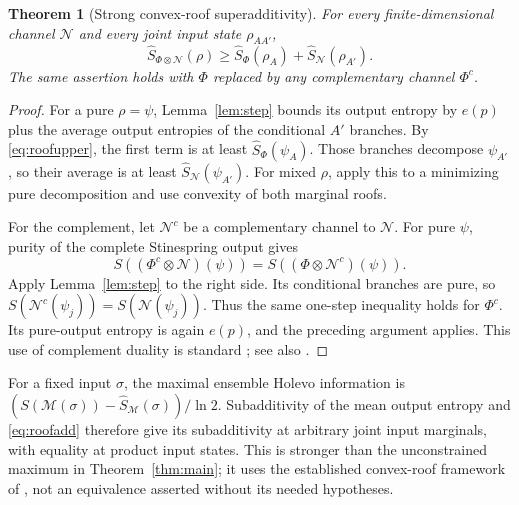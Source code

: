 \documentclass[11pt]{article}
\newtheorem{theorem}{Theorem}
\begin{document}
\begin{theorem}[Strong convex-roof superadditivity]\label{thm:roofadd}
For every finite-dimensional channel $\mathcal N$ and every joint input state
$\rho_{AA'}$,
\begin{equation}\label{eq:roofadd}
 \widehat S_{\Phi\otimes\mathcal N}(\rho)
 \ge \widehat S_\Phi(\rho_A)+\widehat S_{\mathcal N}(\rho_{A'}).
\end{equation}
The same assertion holds with $\Phi$ replaced by any complementary channel
$\Phi^c$.
\end{theorem}
\begin{proof}
For a pure $\rho=\psi$, Lemma~\ref{lem:step} bounds its output entropy by
$e(p)$ plus the average output entropies of the conditional $A'$ branches.
By \eqref{eq:roofupper}, the first term is at least
$\widehat S_\Phi(\psi_A)$. Those branches decompose $\psi_{A'}$, so their
average is at least $\widehat S_{\mathcal N}(\psi_{A'})$.
For mixed $\rho$, apply this to a minimizing pure decomposition and use
convexity of both marginal roofs.

For the complement, let $\mathcal N^c$ be a complementary channel to
$\mathcal N$. For pure $\psi$, purity of the complete Stinespring output gives
\[
 S((\Phi^c\otimes\mathcal N)(\psi))
   =S((\Phi\otimes\mathcal N^c)(\psi)).
\]
Apply Lemma~\ref{lem:step} to the right side. Its conditional branches are
pure, so $S(\mathcal N^c(\psi_j))=S(\mathcal N(\psi_j))$.
Thus the same one-step inequality holds for $\Phi^c$. Its pure-output entropy
is again $e(p)$, and the preceding argument applies. This use of complement
duality is standard \cite[Theorem 1, equations (6) and (9)]{holevocomp};
see also \cite{conjugate}.
\end{proof}

For a fixed input $\sigma$, the maximal ensemble Holevo information is
$(S(\mathcal M(\sigma))-\widehat S_{\mathcal M}(\sigma))/\ln2$.
Subadditivity of the mean output entropy and \eqref{eq:roofadd} therefore
give its subadditivity at arbitrary joint input marginals, with equality
at product input states. This is stronger than the unconstrained maximum in
Theorem~\ref{thm:main}; it uses the established convex-roof framework of
\cite{msw}, not an equivalence asserted without its needed hypotheses.
\end{document}
